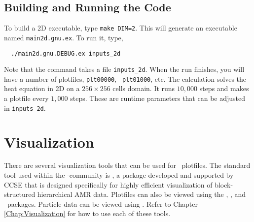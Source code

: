 \subsection{Building and Running the Code}

To build a 2D executable, type {\tt make DIM=2}.  This will generate
an executable named {\tt main2d.gnu.ex}.  To run it, type,
\begin{verbatim}
  ./main2d.gnu.DEBUG.ex inputs_2d
\end{verbatim}
Note that the command takes a file {\tt inputs\_2d}.  When the run
finishes, you will have a number of plotfiles, {\tt plt00000}, {\tt
  plt01000}, etc.  The calculation solves the heat equation in 2D on a
$256 \times 256$ cells domain.  It runs $10,000$ steps and makes a
plotfile every $1,000$ steps.  These are runtime parameters that can
be adjusted in {\tt inputs\_2d}.

\section{Visualization}
There are several visualization tools that can be used for \amrex\
plotfiles.  The standard tool used within the
\amrex-community is \amrvis, a package developed and supported 
by CCSE that is designed specifically for highly efficient visualization
of block-structured hierarchical AMR data.
Plotfiles can also be viewed using the \visit, \paraview, and \yt\ packages.
Particle data can be viewed using \paraview.
Refer to Chapter \ref{Chap:Visualization} for how to use each of these tools.
